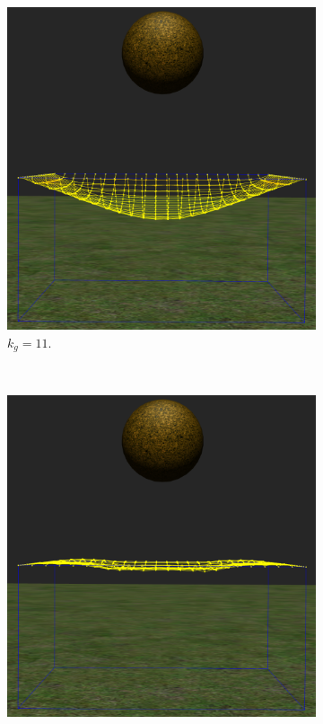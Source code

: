 \begin{figure}
 \centering
  \begin{subfigure}[b]{0.30\textwidth}
    \includegraphics[width=\textwidth]{img/04/varPress1}
    \caption{$k_g=11$.}
  \end{subfigure}
~
  \begin{subfigure}[b]{0.30\textwidth}
    \includegraphics[width=\textwidth]{img/04/varPress2}

\end{subfigure}
\end{figure}
